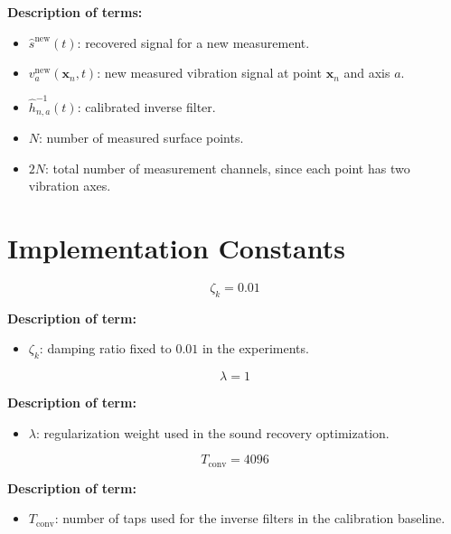 \documentclass[11pt]{article}
\begin{document}
\textbf{Description of terms:}

\begin{itemize}
    \item $\hat{s}^{\mathrm{new}}(t)$: recovered signal for a new measurement.
    \item $v_a^{\mathrm{new}}(\bm{x}_n,t)$: new measured vibration signal at point $\bm{x}_n$ and axis $a$.
    \item $\hat{h}_{n,a}^{-1}(t)$: calibrated inverse filter.
    \item $N$: number of measured surface points.
    \item $2N$: total number of measurement channels, since each point has two vibration axes.
\end{itemize}

\section{Implementation Constants}

\begin{equation}
\zeta_k = 0.01
\end{equation}

\textbf{Description of term:}

\begin{itemize}
    \item $\zeta_k$: damping ratio fixed to $0.01$ in the experiments.
\end{itemize}

\begin{equation}
\lambda = 1
\end{equation}

\textbf{Description of term:}

\begin{itemize}
    \item $\lambda$: regularization weight used in the sound recovery optimization.
\end{itemize}

\begin{equation}
T_{\mathrm{conv}} = 4096
\end{equation}

\textbf{Description of term:}

\begin{itemize}
    \item $T_{\mathrm{conv}}$: number of taps used for the inverse filters in the calibration baseline.
\end{itemize}
\end{document}
